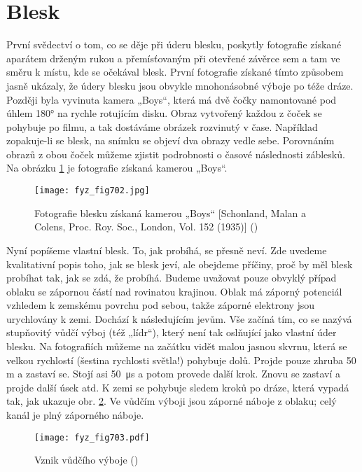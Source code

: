  \section{Blesk}\label{fyz:IIchapIXsecVI}   
    První svědectví o tom, co se děje při úderu blesku, poskytly fotografie získané aparátem drženým
    rukou a přemísťovaným při otevřené závěrce sem a tam ve směru k místu, kde se očekával blesk.
    První fotografie získané tímto způsobem jasně ukázaly, že údery blesku jsou obvykle mnohonásobné
    výboje po téže dráze. Později byla vyvinuta kamera „Boys“, která má dvě čočky namontované pod
    úhlem \ang{180} na rychle rotujícím disku. Obraz vytvořený každou z čoček se pohybuje po filmu,
    a tak dostáváme obrázek rozvinutý v čase. Například zopakuje-li se blesk, na snímku se objeví
    dva obrazy vedle sebe. Porovnáním obrazů z obou čoček můžeme zjistit podrobnosti o časové
    následnosti záblesků. Na obrázku \ref{fyz:fig702} je fotografie získaná kamerou „Boys“.
  
    \begin{figure}[ht!] %
      \centering
      \texttt{[image: fyz\_fig702.jpg]}
      \caption{Fotografie blesku získaná kamerou „Boys“ [Schonland, Malan a Colens, Proc. Roy. Soc.,
               London, Vol. 152 (1935)] (\cite[s.~707]{Feynman02})}
      \label{fyz:fig702}
    \end{figure}

    Nyní popíšeme vlastní blesk. To, jak probíhá, se přesně neví. Zde uvedeme kvalitativní popis
    toho, jak se blesk jeví, ale obejdeme příčiny, proč by měl blesk probíhat tak, jak se zdá, že
    probíhá. Budeme uvažovat pouze obvyklý případ oblaku se zápornou částí nad rovinatou krajinou.
    Oblak má záporný potenciál vzhledem k zemskému povrchu pod sebou, takže záporné elektrony jsou
    urychlovány k zemi. Dochází k následujícím jevům. Vše začíná tím, co se nazývá stupňovitý vůdčí
    výboj (též „lídr“), který není tak oslňující jako vlastní úder blesku. Na fotografiích můžeme na
    začátku vidět malou jasnou skvrnu, která se velkou rychlostí (šestina rychlosti světla!)
    pohybuje dolů. Projde pouze zhruba 50 m a zastaví se. Stojí asi \SI{50}{\us} a potom provede
    další krok. Znovu se zastaví a projde další úsek atd. K zemi se pohybuje sledem kroků po dráze,
    která vypadá tak, jak ukazuje obr. \ref{fyz:fig703}. Ve vůdčím výboji jsou záporné náboje z
    oblaku; celý kanál je plný záporného náboje.


    \begin{figure}[ht!] %
      \centering
      \texttt{[image: fyz\_fig703.pdf]}
      \caption{Vznik vůdčího výboje (\cite[s.~707]{Feynman02})}
      \label{fyz:fig703}
    \end{figure}

